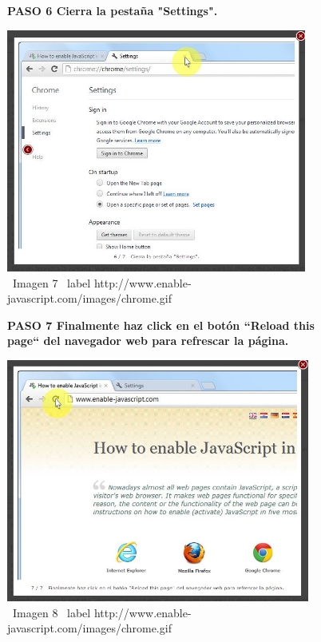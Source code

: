 \documentclass[11pt]{article} %
\begin{document}
\begin{figure}
\begin{center}
\begin{center}

\bf PASO 6 Cierra la pestaña "Settings".
\end{center}

\includegraphics[height=8cm, width=8 cm] {imagenes/chrome 06.jpg}
\newline
\newline
\ Imagen 7
\ label { http://www.enable-javascript.com/images/chrome.gif }


\end{center}
\end{figure}


\begin{figure}
\begin{center}
\begin{center}
\bf PASO 7
Finalmente haz click en el botón ``Reload this page`` del navegador web para refrescar la página.
\newline
\end{center}

\includegraphics[height=8cm, width=8 cm] {imagenes/chrome 07.jpg}
\newline
\ Imagen 8
\ label { http://www.enable-javascript.com/images/chrome.gif }
\end{center}
\end{figure}
\end{document}
